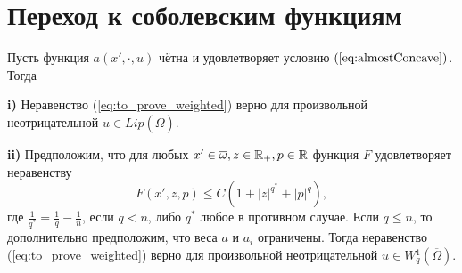 \section{Переход к соболевским функциям}
\label{sec:sobolev_bounded}

\begin{thm}
\label{thm:bounded_growth}
Пусть функция $a(x', \cdot, u)$ чётна и удовлетворяет условию $(\ref{eq:almostConcave})$.
Тогда

\textbf{\textup{i)}} Неравенство (\ref{eq:to_prove_weighted}) верно для произвольной неотрицательной $u \in Lip(\overline{\Omega})$.

\textbf{\textup{ii)}} Предположим, что для любых $x' \in \overline{\omega}, z \in \Real_+, p \in \Real$
функция $F$ удовлетворяет неравенству
$$F( x', z, p ) \le C ( 1 + |z|^{q^*} + |p|^q ),$$
где $\frac{1}{q^*} = \frac{1}{q} - \frac{1}{n}$, если $q < n$, либо $q^*$ любое в противном случае.
Если $q \le n$, то дополнительно предположим, что веса $a$ и $a_i$ ограничены.
Тогда неравенство (\ref{eq:to_prove_weighted}) верно для произвольной неотрицательной $u \in W{}^1_q(\overline{\Omega})$.
\end{thm}

